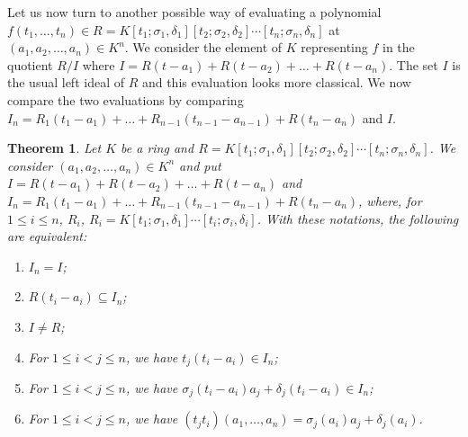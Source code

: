 \documentclass{amsproc}
\newtheorem{theorem}{Theorem}[section]
\newcommand{\de}{\delta}
\newcommand{\si}{\sigma}
\numberwithin{equation}{section}
\newcommand{\mulo}{K[t_1;\si_1,\de_1][t_2;\si_2,\de_2]\cdots[t_n;\si_n,\de_n]}
\begin{document}
Let us now turn to another possible way of evaluating a polynomial $f(t_1,\dots, t_n)\in R=\mulo$ at $(a_1,a_2, \dots, a_n)\in K^n$.   We consider the element of $K$ 
representing $f$ in the quotient $R/I$ where 
$I=R(t-a_1)+R(t-a_2)+\dots + R(t-a_n)$.   The set $I$ is the usual left ideal of $R$ and this evaluation looks more 
classical.   We now compare the two evaluations by 
comparing $I_n=R_1(t_1-a_1)+ \dots +R_{n-1}(t_{n-1}-a_{n-1})+R(t_n-a_n)$ and $I$. 
%
%
%
%
%
\begin{theorem}
	Let $K$ be a ring and $R=\mulo$.  We consider $(a_1,a_2,\dots,a_n)\in K^n$ and put $I=R(t-a_1)+R(t-a_2)+\dots + R(t-a_n)$ and $I_n=R_1(t_1-a_1)+ \dots +R_{n-1}(t_{n-1}-a_{n-1})+R(t_n-a_n)$, where, for $1\le i \le n$, $R_i$, $R_i=K[t_1;\si_1,\de_1]\cdots [t_i;\si_i,\de_i]$.   With these notations, the following are equivalent:
	\begin{enumerate}
		\item $I_n=I$;
		\item $R(t_i-a_i)\subseteq I_n$;
		\item $I\ne R$;
		\item For $1\le i <j \le n$, we have $t_j(t_i-a_i)\in I_n$;
		\item For $1\le i <j \le n$, we have $\si_j(t_i-a_i)a_j + \de_j(t_i-a_i)\in I_n$;
		\item For $1\le i <j \le n$, we have $(t_jt_i)(a_1,\dots,a_n)=\si_j(a_i)a_j+\de_j(a_i)$.
		
	\end{enumerate}
\end{theorem}
\end{document}
